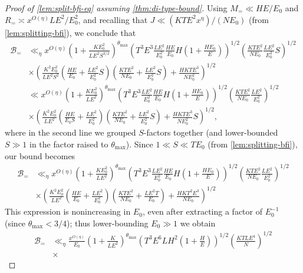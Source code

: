 \documentclass[reqno,11pt]{amsart}
\theoremstyle{definition}
\theoremstyle{remark}
\numberwithin{equation}{section}
\newcommand{\mB}{\mathcal{B}}
\begin{document}
\begin{proof}[Proof of \cref{lem:split-bfi-eq} assuming \cref{thm:di-type-bound}]
Using $M_= \ll HE/E_0$ and $R_= \asymp x^{O(\eta)} LE^2/E_0^2$, and recalling that $J \ll (KTE^2 x^\eta)/ (NE_0)$ (from \cref{lem:splitting-bfi}), we conclude that
\[
\begin{aligned}
    \mB_= &\ll_\eta x^{O(\eta)} 
    \left(1 + \frac{KE_0^2}{LE^2S^{3/2}}\right)^{\theta_{\max}}
    \left(T^3 E^3 \frac{LE^2}{E_0^2} \frac{HE}{E_0} H\left(1 + \frac{HE_0}{E}\right)\right)^{1/2}
    \left(\frac{KTE^2}{NE_0} \frac{LE^2}{E_0^2} S\right)^{1/2}
    \\
    &\times
    \left(\frac{K^2 E_0^2}{L E^2 S^2} \left(\frac{HE}{E_0} + \frac{L E^2}{E_0^2} S\right)\left(\frac{KTE^2}{NE_0} + \frac{L E^2}{E_0^2}S\right) + \frac{HKTE^3}{NE_0^2} \right)^{1/2}
    \\
    &\ll
    x^{O(\eta)} 
    \left(1 + \frac{KE_0^2}{LE^2}\right)^{\theta_{\max}}
    \left(T^3 E^3 \frac{LE^2}{E_0^2} \frac{HE}{E_0} H\left(1 + \frac{HE_0}{E}\right)\right)^{1/2}
    \left(\frac{KTE^2}{NE_0} \frac{LE^2}{E_0^2} \right)^{1/2}
    \\
    &\times
    \left(\frac{K^2 E_0^2}{L E^2} \left(\frac{HE}{E_0 S} + \frac{L E^2}{E_0^2}\right)\left(\frac{KTE^2}{NE_0} + \frac{L E^2}{E_0^2}S\right) + \frac{HKTE^3}{NE_0^2}S \right)^{1/2},
\end{aligned}
\]
where in the second line we grouped $S$-factors together (and lower-bounded $S \gg 1$ in the factor raised to $\theta_{\max}$). Since $1 \ll S \ll TE_0$ (from \cref{lem:splitting-bfi}), our bound becomes
\[
\begin{aligned}
    \mB_= &\ll_\eta
    x^{O(\eta)}
    \left(1 + \frac{KE_0^2}{LE^2}\right)^{\theta_{\max}}
    \left(T^3 E^3 \frac{LE^2}{E_0^2} \frac{HE}{E_0} H\left(1 + \frac{HE_0}{E}\right)\right)^{1/2}
    \left(\frac{KTE^2}{NE_0} \frac{LE^2}{E_0^2} \right)^{1/2}
    \\
    &\times
    \left(\frac{K^2 E_0^2}{L E^2} \left(\frac{HE}{E_0} + \frac{L E^2}{E_0^2}\right)\left(\frac{KTE^2}{NE_0} + \frac{L E^2 T}{E_0}\right) + \frac{HKT^2E^3}{NE_0} \right)^{1/2}
\end{aligned}
\]
This expression is nonincreasing in $E_0$, even after extracting a factor of $E_0^{-1}$ (since $\theta_{\max} < 3/4$); thus lower-bounding $E_0 \gg 1$ we obtain
\[
\begin{aligned}
    \mB_= &\ll_\eta
    \frac{x^{O(\eta)}}{E_0}
    \left(1 + \frac{K}{LE^2}\right)^{\theta_{\max}}
    \left(T^3 E^6 L H^2 \left(1 + \frac{H}{E}\right)\right)^{1/2}
    \left(\frac{KTLE^4}{N}\right)^{1/2}
    \\
    &\times

\end{aligned}\]
\end{proof}
\end{document}
